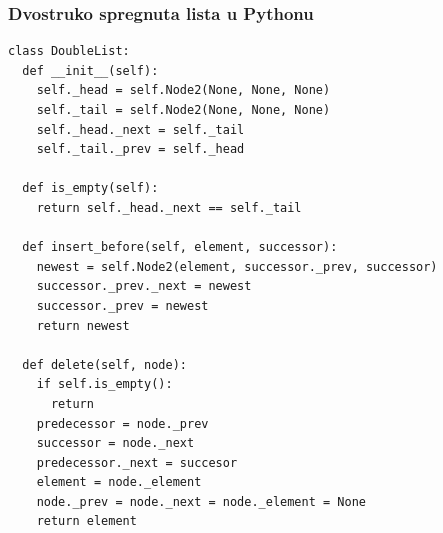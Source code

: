 \documentclass[compress]{beamer}
\begin{document}
\begin{frame}
  \frametitle{Dvostruko spregnuta lista u Pythonu}
\begin{verbatim}
class DoubleList:
  def __init__(self):
    self._head = self.Node2(None, None, None)
    self._tail = self.Node2(None, None, None)
    self._head._next = self._tail
    self._tail._prev = self._head

  def is_empty(self):
    return self._head._next == self._tail
    
  def insert_before(self, element, successor):
    newest = self.Node2(element, successor._prev, successor)
    successor._prev._next = newest
    successor._prev = newest
    return newest
    
  def delete(self, node):
    if self.is_empty():
      return
    predecessor = node._prev
    successor = node._next
    predecessor._next = succesor
    element = node._element
    node._prev = node._next = node._element = None
    return element
\end{verbatim}
\end{frame}
\end{document}
